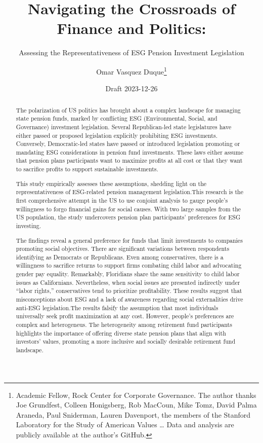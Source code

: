 \documentclass[
  12pt,
]{article}
\title{Navigating the Crossroads of Finance and Politics:}
\subtitle{Assessing the Representativeness of ESG Pension Investment Legislation}
\author{Omar Vasquez Duque\footnote{Academic Fellow, Rock Center for Corporate Governance. The author thanks Joe Grundfest, Colleen Honigsberg, Rob MacCoun, Mike Tomz, David Palma Araneda, Paul Sniderman, Lauren Davenport, the members of the Stanford Laboratory for the Study of American Values \ldots{} Data and analysis are publicly available at the author's GitHub.}}
\date{Draft 2023-12-26}
\begin{document}
\maketitle
\begin{abstract}
\fontsize{11pt}{12pt}\selectfont

The polarization of US politics has brought about a complex landscape for managing state pension funds, marked by conflicting ESG (Environmental, Social, and Governance) investment legislation. Several Republican-led state legislatures have either passed or proposed legislation explicitly prohibiting ESG investments. Conversely, Democratic-led states have passed or introduced legislation promoting or mandating ESG considerations in pension fund investments. These laws either assume that pension plans participants want to maximize profits at all cost or that they want to sacrifice profits to support sustainable investments.

This study empirically assesses these assumptions, shedding light on the representativeness of ESG-related pension management legislation.This research is the first comprehensive attempt in the US to use conjoint analysis to gauge people's willingness to forgo financial gains for social causes. With two large samples from the US population, the study undercovers pension plan participants' preferences for ESG investing.

The findings reveal a general preference for funds that limit investments to companies promoting social objectives. There are significant variations between respondents identifying as Democrats or Republicans. Even among conservatives, there is a willingness to sacrifice returns to support firms combating child labor and advocating gender pay equality. Remarkably, Floridians share the same sensitivity to child labor issues as Californians. Nevertheless, when social issues are presented indirectly under ``labor rights,'' conservatives tend to prioritize profitability. These results suggest that misconceptions about ESG and a lack of awareness regarding social externalities drive anti-ESG legislation.The results falsify the assumption that most individuals universally seek profit maximization at any cost. However, people's preferences are complex and heterogeneus. The heterogeneity among retirement fund participants highlights the importance of offering diverse state pension plans that align with investors' values, promoting a more inclusive and socially desirable retirement fund landscape.
\end{abstract}
\end{document}
